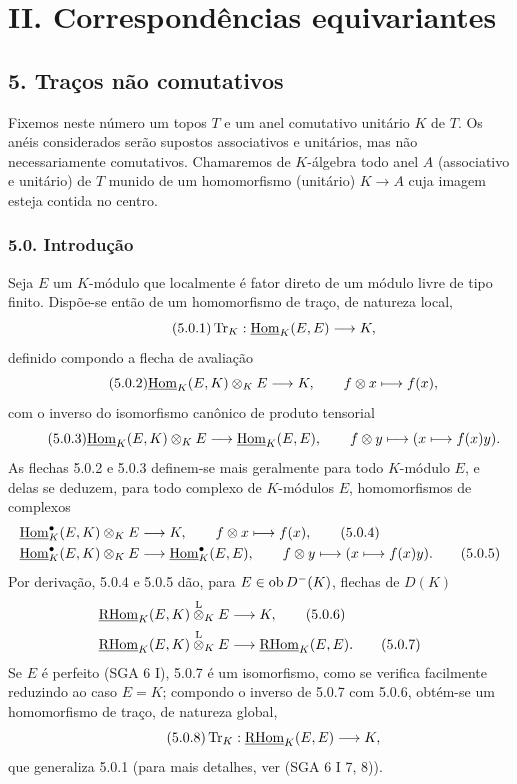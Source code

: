 \section*{II. Correspondências equivariantes}

\subsection*{5. Traços não comutativos}

Fixemos neste número um topos $T$ e um anel comutativo unitário $K$ de $T$. Os anéis considerados serão supostos associativos e unitários, mas não necessariamente comutativos. Chamaremos de $K$-álgebra todo anel $A$ (associativo e unitário) de $T$ munido de um homomorfismo (unitário) $K\to A$ cuja imagem esteja contida no centro.

\subsubsection*{5.0. Introdução}

Seja $E$ um $K$-módulo que localmente é fator direto de um módulo livre de tipo finito. Dispõe-se então de um homomorfismo de traço, de natureza local,
\begin{equation}\tag{5.0.1}
\operatorname{Tr}_K:\underline{\operatorname{Hom}}_K(E,E)\longrightarrow K,
\end{equation}
definido compondo a flecha de avaliação
\begin{equation}\tag{5.0.2}
\underline{\operatorname{Hom}}_K(E,K)\otimes_KE\longrightarrow K,\qquad f\otimes x\longmapsto f(x),
\end{equation}
com o inverso do isomorfismo canônico de produto tensorial
\begin{equation}\tag{5.0.3}
\underline{\operatorname{Hom}}_K(E,K)\otimes_KE\longrightarrow\underline{\operatorname{Hom}}_K(E,E),\qquad f\otimes y\longmapsto (x\longmapsto f(x)y).
\end{equation}
As flechas 5.0.2 e 5.0.3 definem-se mais geralmente para todo $K$-módulo $E$, e delas se deduzem, para todo complexo de $K$-módulos $E$, homomorfismos de complexos
\begin{align}
\underline{\operatorname{Hom}}_K^\bullet(E,K)\otimes_KE&\longrightarrow K,\qquad f\otimes x\longmapsto f(x),\tag{5.0.4}\\
\underline{\operatorname{Hom}}_K^\bullet(E,K)\otimes_KE&\longrightarrow \underline{\operatorname{Hom}}_K^\bullet(E,E),\qquad f\otimes y\longmapsto (x\longmapsto f(x)y).\tag{5.0.5}
\end{align}
Por derivação, 5.0.4 e 5.0.5 dão, para $E\in\operatorname{ob} D^-(K)$, flechas de $D(K)$
\begin{align}
\underline{\mathrm{RHom}}_K(E,K)\overset{\mathrm L}{\otimes}_KE&\longrightarrow K,\tag{5.0.6}\\
\underline{\mathrm{RHom}}_K(E,K)\overset{\mathrm L}{\otimes}_KE&\longrightarrow\underline{\mathrm{RHom}}_K(E,E).\tag{5.0.7}
\end{align}
Se $E$ é perfeito (SGA 6 I), 5.0.7 é um isomorfismo, como se verifica facilmente reduzindo ao caso $E=K$; compondo o inverso de 5.0.7 com 5.0.6, obtém-se um homomorfismo de traço, de natureza global,
\begin{equation}\tag{5.0.8}
\operatorname{Tr}_K:\underline{\mathrm{RHom}}_K(E,E)\longrightarrow K,
\end{equation}
que generaliza 5.0.1 (para mais detalhes, ver (SGA 6 I 7, 8)).
